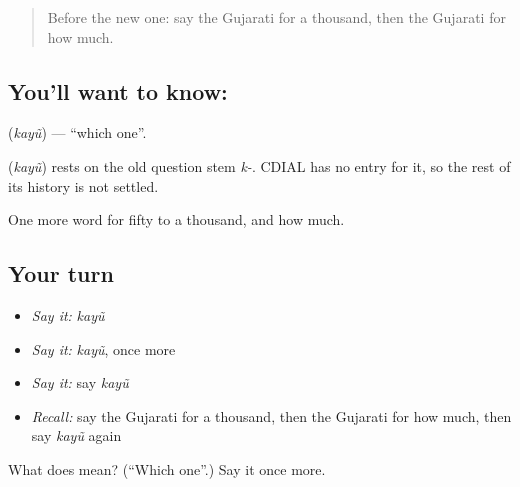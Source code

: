 \label{lesson:GU-C83-which}



\begin{quote}
Before the new one: say the Gujarati for a thousand, then the Gujarati for how much.
\end{quote}

\subsection*{You'll want to know: }
\textbf{} (\emph{kayũ}) — \textquotedblleft{}which one\textquotedblright{}.

\begin{cousinweb}
\textbf{} (\emph{kayũ}) rests on the old question stem \emph{k-}. CDIAL has no entry for it, so the rest of its history is not settled.
\end{cousinweb}

\begin{grammarlens}[title={What you've built}]
One more word for fifty to a thousand, and how much.
\end{grammarlens}

\subsection*{Your turn}
\begin{itemize}
\raggedright
  \item \emph{Say it:} \emph{kayũ}
  \item \emph{Say it:} \emph{kayũ}, once more
  \item \emph{Say it:} say \emph{kayũ}
  \item \emph{Recall:} say the Gujarati for a thousand, then the Gujarati for how much, then say \emph{kayũ} again
\end{itemize}

\begin{tcolorbox}[breakable,colback=teal!4,colframe=teal!35!black,title={Before you move on}]
What does  mean? (\textquotedblleft{}Which one\textquotedblright{}.) Say it once more.
\end{tcolorbox}
